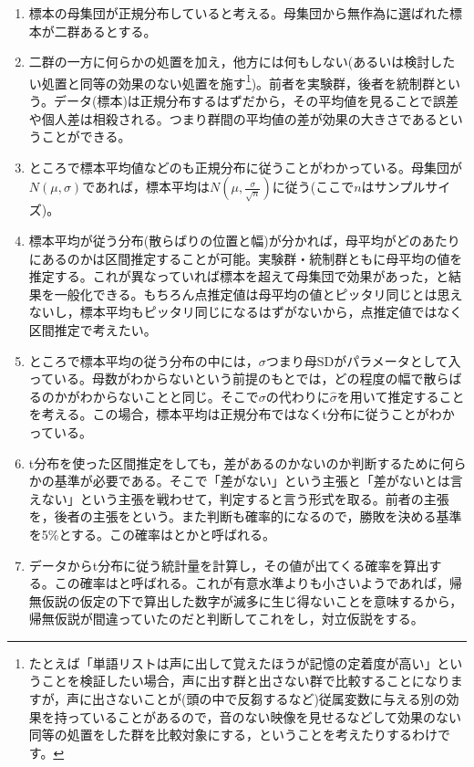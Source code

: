 \begin{enumerate}
	\item 標本の母集団が正規分布していると考える。母集団から無作為に選ばれた標本が二群あるとする。
	\item 二群の一方に何らかの処置を加え，他方には何もしない(あるいは検討したい処置と同等の効果のない処置を施す\footnote{たとえば「単語リストは声に出して覚えたほうが記憶の定着度が高い」ということを検証したい場合，声に出す群と出さない群で比較することになりますが，声に出さないことが(頭の中で反芻するなど)従属変数に与える別の効果を持っていることがあるので，音のない映像を見せるなどして効果のない同等の処置をした群を比較対象にする，ということを考えたりするわけです。})。前者を実験群，後者を統制群という。データ(標本)は正規分布するはずだから，その平均値を見ることで誤差や個人差は相殺される。つまり群間の平均値の差が効果の大きさであるということができる。
	\item ところで標本平均値などのも正規分布に従うことがわかっている。母集団が$N(\mu,\sigma)$であれば，標本平均は$N(\mu, \frac{\sigma}{\sqrt{n}})$に従う(ここで$n$はサンプルサイズ)。
	\item 標本平均が従う分布(散らばりの位置と幅)が分かれば，母平均がどのあたりにあるのかは区間推定することが可能。実験群・統制群ともに母平均の値を推定する。これが異なっていれば標本を超えて母集団で効果があった，と結果を一般化できる。もちろん点推定値は母平均の値とピッタリ同じとは思えないし，標本平均もピッタリ同じになるはずがないから，点推定値ではなく区間推定で考えたい。
	\item ところで標本平均の従う分布の中には，$\sigma$つまり母SDがパラメータとして入っている。母数がわからないという前提のもとでは，どの程度の幅で散らばるのかがわからないことと同じ。そこで$\sigma$の代わりに$\hat{\sigma}$を用いて推定することを考える。この場合，標本平均は正規分布ではなくt分布に従うことがわかっている。
	\item t分布を使った区間推定をしても，差があるのかないのか判断するために何らかの基準が必要である。そこで「差がない」という主張と「差がないとは言えない」という主張を戦わせて，判定すると言う形式を取る。前者の主張を，後者の主張をという。また判断も確率的になるので，勝敗を決める基準を5\%とする。この確率はとかと呼ばれる。
	\item データからt分布に従う統計量を計算し，その値が出てくる確率を算出する。この確率はと呼ばれる。これが有意水準よりも小さいようであれば，帰無仮説の仮定の下で算出した数字が滅多に生じ得ないことを意味するから，帰無仮説が間違っていたのだと判断してこれをし，対立仮説をする。
\end{enumerate}
